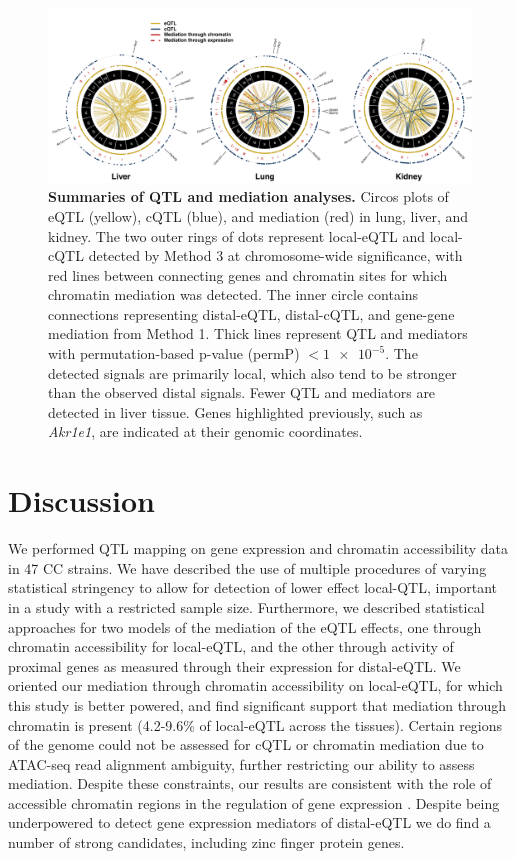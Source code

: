 \documentclass[9pt,twocolumn,twoside]{gsajnl}
\begin{document}
\begin{figure}[h!]
\renewcommand{\familydefault}{\sfdefault}\normalfont
\centering
\includegraphics[width=\textwidth, trim={0in 0in 0in 0in}, clip]{figs/circos_over_tissues.pdf}
\caption{\textbf{Summaries of QTL and mediation analyses.} Circos plots of eQTL (yellow), cQTL (blue), and mediation (red) in lung, liver, and kidney. The two outer rings of dots represent local-eQTL and local-cQTL detected by Method 3 at chromosome-wide significance, with red lines between connecting genes and chromatin sites for which chromatin mediation was detected. The inner circle contains connections representing distal-eQTL, distal-cQTL, and gene-gene mediation from Method 1. Thick lines represent QTL and mediators with permutation-based p-value (permP) $< \num{1e-5}$. The detected signals are primarily local, which also tend to be stronger than the observed distal signals. Fewer QTL and mediators are detected in liver tissue. 
Genes highlighted previously, such as \textit{Akr1e1}, are indicated at their genomic coordinates.
\label{fig:circos_plot}}
\end{figure}

\section{Discussion}

We performed QTL mapping on gene expression and chromatin accessibility data in 47 CC strains. We have described the use of multiple procedures of varying statistical stringency to allow for detection of lower effect local-QTL, important in a study with a restricted sample size. 
Furthermore, we described statistical approaches for two models of the mediation of the eQTL effects, one through chromatin accessibility for local-eQTL, and the other through activity of proximal genes as measured through their expression for distal-eQTL. We oriented our mediation through chromatin accessibility on local-eQTL, for which this study is better powered, and find significant support that mediation through chromatin is present (4.2-9.6\% of local-eQTL across the tissues). Certain regions of the genome could not be assessed for cQTL or chromatin mediation due to ATAC-seq read alignment ambiguity, further restricting our ability to assess mediation. Despite these constraints, our results are consistent with the role of accessible chromatin regions in the regulation of gene expression \citep{Klemm2019}. Despite being underpowered to detect gene expression mediators of distal-eQTL we do find a number of strong candidates, including zinc finger protein genes. 
\end{document}
